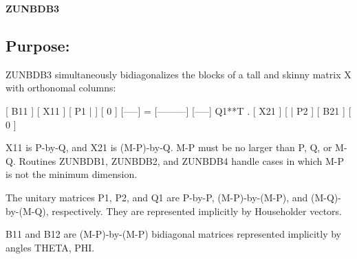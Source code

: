 {\bfseries Z\+U\+N\+B\+D\+B3} 

\subsection*{Purpose\+: }

\begin{DoxyVerb} ZUNBDB3 simultaneously bidiagonalizes the blocks of a tall and skinny
 matrix X with orthonomal columns:

                            [ B11 ]
      [ X11 ]   [ P1 |    ] [  0  ]
      [-----] = [---------] [-----] Q1**T .
      [ X21 ]   [    | P2 ] [ B21 ]
                            [  0  ]

 X11 is P-by-Q, and X21 is (M-P)-by-Q. M-P must be no larger than P,
 Q, or M-Q. Routines ZUNBDB1, ZUNBDB2, and ZUNBDB4 handle cases in
 which M-P is not the minimum dimension.

 The unitary matrices P1, P2, and Q1 are P-by-P, (M-P)-by-(M-P),
 and (M-Q)-by-(M-Q), respectively. They are represented implicitly by
 Householder vectors.

 B11 and B12 are (M-P)-by-(M-P) bidiagonal matrices represented
 implicitly by angles THETA, PHI.\end{DoxyVerb}
 
